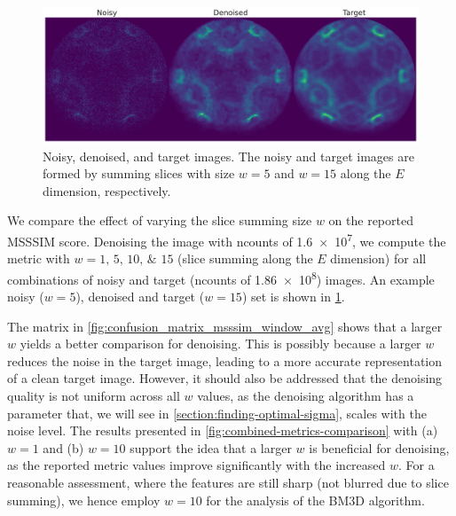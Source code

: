 \begin{figure}
    \centering
    \includegraphics[width=1\linewidth]{images/noisy_denoised_ref_16M_avg_bm3d.pdf}
    \caption{Noisy, denoised, and target images. The noisy and target images are formed by summing slices with size $w=5$ and $w=15$ along the $E$ dimension, respectively.}
    \label{fig:noisy-denoised-ref-16M-avg-bm3d}
\end{figure}

We compare the effect of varying the slice summing size $w$ on the reported \gls{MSSSIM} score. Denoising the image with \gls{ncounts} of \num{1.6e7}, we compute the metric with $w = \numlist{1;5;10;15}$ (slice summing along the $E$ dimension) for all combinations of noisy and target (\gls{ncounts} of \num{1.86e8}) images. An example noisy ($w = 5$), denoised and target ($w=15$) set is shown in \cref{fig:noisy-denoised-ref-16M-avg-bm3d}. 

The matrix in \cref{fig:confusion_matrix_msssim_window_avg} shows that a larger $w$ yields a better comparison for denoising.  This is possibly because a larger $w$ reduces the noise in the target image, leading to a more accurate representation of a clean target image. However, it should also be addressed that the denoising quality is not uniform across all $w$ values, as the denoising algorithm has a parameter that, we will see in \cref{section:finding-optimal-sigma}, scales with the noise level. The results presented in \cref{fig:combined-metrics-comparison} with (a) $w=1$ and (b) $w=10$ support the idea that a larger $w$ is beneficial for denoising, as the reported metric values improve significantly with the increased $w$. For a reasonable assessment, where the features are still sharp (not blurred due to slice summing), we hence employ $w=10$ for the analysis of the \gls{BM3D} algorithm.



